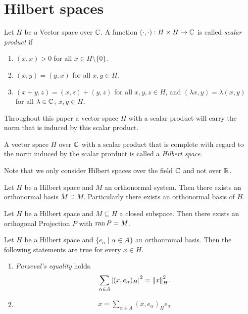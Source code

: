 \section{Hilbert spaces}

\begin{definition}
	Let $H$ be a Vector space over $\C$. A function $(\cdot, \cdot): H \times H \to \C$ is called \textit{scalar product} if 
	\begin{enumerate}
		\item $(x,x) > 0$ for all $x \in H \setminus \{0\}$.
		\item $(x,y) = \overline{(y,x)}$ for all $x,y \in H$.
		\item $(x + y, z) = (x,z) + (y,z)$ for all $x,y,z \in H$, and $(\lambda x, y) = \lambda (x,y)$ for all $\lambda \in \C$, $x,y \in H$. 
	\end{enumerate}
\end{definition}

Throughout this paper a vector space $H$ with a scalar product will carry the norm that is induced by this scalar product.

\begin{definition}
	A vector space $H$ over $\C$ with a scalar product that is complete with regard to the norm induced by the scalar prorduct is called a \textit{Hilbert space}.
\end{definition}

Note that we only consider Hilbert spaces over the field $\C$ and not over $\R$. 

\begin{lemma}\label{lemma:onb}
	Let $H$ be a Hilbert space and $M$ an orthonormal system. Then there exists an orthonormal basis $\tilde{M} \supseteq M$. Particularly there exists an orthonormal basis of $H$. 
\end{lemma}

\begin{lemma}
	Let $H$ be a Hilbert space and $M \subseteq H$ a closed subspace. Then there exists an orthogonal Projection $P$ with $\ran P = M$. 
\end{lemma}

\begin{lemma}
	Let $H$ be a Hilbert space and $\{e_\alpha \mid \alpha \in A\}$ an orthonromal basis. Then the following statements are true for every $x \in H$.
	\begin{enumerate}
		\item \textit{Parzeval's equality} holds.
		\begin{align}\label{eq:parzeval}
		\sum_{\alpha \in A} \vbraces{(x, e_\alpha)_H}^2 = \norm[H]{x}^2.
		\end{align}
		
		\item 
		\begin{align} \label{eq:fourierseries}
		x = \sum_{\alpha \in A} (x, e_\alpha)_H e_\alpha
		\end{align}
	\end{enumerate} 
\end{lemma}

